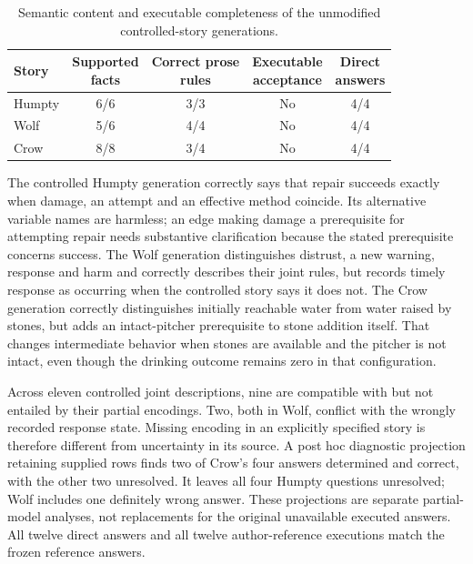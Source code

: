 \documentclass{svproc}
\begin{document}
\begin{table}[htbp]
\caption{Semantic content and executable completeness of the unmodified controlled-story generations.}\label{tab:stories}
\centering\small
\setlength{\tabcolsep}{6pt}
\begin{tabular}{@{}lcccc@{}}
\toprule
Story & \shortstack{Supported\\facts} & \shortstack{Correct prose\\rules} & \shortstack{Executable\\acceptance} & \shortstack{Direct\\answers} \\
\midrule
Humpty & 6/6 & 3/3 & No & 4/4 \\
Wolf & 5/6 & 4/4 & No & 4/4 \\
Crow & 8/8 & 3/4 & No & 4/4 \\
\bottomrule
\end{tabular}
\end{table}

The controlled Humpty generation correctly says that repair succeeds exactly when damage, an attempt and an effective method coincide. Its alternative variable names are harmless; an edge making damage a prerequisite for attempting repair needs substantive clarification because the stated prerequisite concerns success. The Wolf generation distinguishes distrust, a new warning, response and harm and correctly describes their joint rules, but records timely response as occurring when the controlled story says it does not. The Crow generation correctly distinguishes initially reachable water from water raised by stones, but adds an intact-pitcher prerequisite to stone addition itself. That changes intermediate behavior when stones are available and the pitcher is not intact, even though the drinking outcome remains zero in that configuration.

Across eleven controlled joint descriptions, nine are compatible with but not entailed by their partial encodings. Two, both in Wolf, conflict with the wrongly recorded response state. Missing encoding in an explicitly specified story is therefore different from uncertainty in its source. A post hoc diagnostic projection retaining supplied rows finds two of Crow's four answers determined and correct, with the other two unresolved. It leaves all four Humpty questions unresolved; Wolf includes one definitely wrong answer. These projections are separate partial-model analyses, not replacements for the original unavailable executed answers. All twelve direct answers and all twelve author-reference executions match the frozen reference answers.
\end{document}
